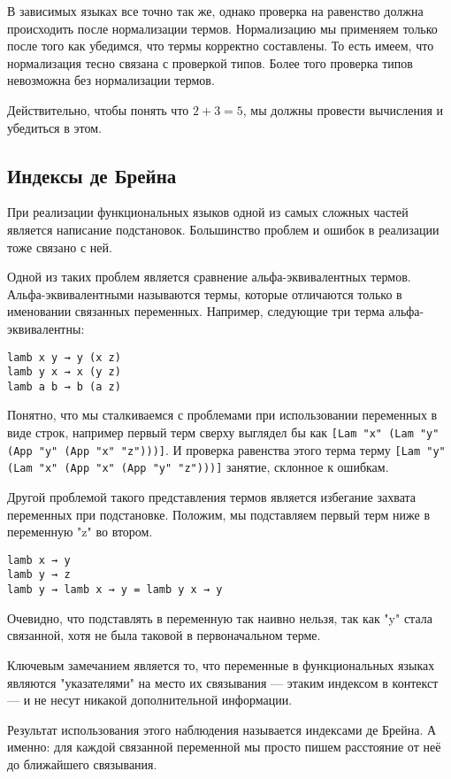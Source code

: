 В зависимых языках все точно так же, однако проверка на равенство должна происходить после нормализации термов. Нормализацию мы применяем только после того как убедимся, что термы корректно составлены. То есть имеем, что нормализация тесно связана с проверкой типов. Более того проверка типов невозможна без нормализации термов.

Действительно, чтобы понять что $2 + 3 = 5$, мы должны провести вычисления и убедиться в этом.

\subsection{Индексы де Брейна}\label{de_brujin}
При реализации функциональных языков одной из самых сложных частей является написание подстановок. Большинство проблем и ошибок в реализации тоже связано с ней.

Одной из таких проблем является сравнение альфа-эквивалентных термов. Альфа-эквивалентными называются термы, которые отличаются только в именовании связанных переменных. Например, следующие три терма альфа-эквивалентны:

\begin{lstlisting}
lamb x y → y (x z)
lamb y x → x (y z)
lamb a b → b (a z)
\end{lstlisting}

Понятно, что мы сталкиваемся с проблемами при использовании переменных в виде строк, например первый терм сверху выглядел бы как \lstinline{[Lam "x" (Lam "y" (App "y" (App "x" "z")))]}. И проверка равенства этого терма терму \lstinline{[Lam "y" (Lam "x" (App "x" (App "y" "z")))]} занятие, склонное к ошибкам.

Другой проблемой такого представления термов является избегание захвата переменных при подстановке. Положим, мы подставляем первый терм ниже в переменную "z" во втором.
\begin{lstlisting}
lamb x → y
lamb y → z
lamb y → lamb x → y = lamb y x → y
\end{lstlisting}

Очевидно, что подставлять в переменную так наивно нельзя, так как "y" стала связанной, хотя не была таковой в первоначальном терме.

Ключевым замечанием является то, что переменные в функциональных языках являются "указателями" на место их связывания --- этаким индексом в контекст --- и не несут никакой дополнительной информации.

Результат использования этого наблюдения называется индексами де Брейна. А именно: для каждой связанной переменной мы просто пишем расстояние от неё до ближайшего связывания.

